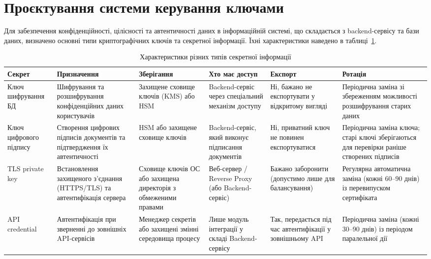 \section{Проєктування системи керування ключами}

Для забезпечення конфіденційності, цілісності та автентичності даних в інформаційній системі, що складається
з backend-сервісу та бази даних, визначено основні типи криптографічних ключів та секретної інформації. Їхні
характеристики наведено в таблиці~\ref{tab:secret_types}.

\begin{table}[H]
\centering
\footnotesize
\renewcommand{\arraystretch}{1.4}
\setlength{\tabcolsep}{4pt}
\begin{tabular}{|>{\raggedright\arraybackslash}p{2.0cm}|>{\raggedright\arraybackslash}p{2.8cm}|>{\raggedright\arraybackslash}p{2.7cm}|>{\raggedright\arraybackslash}p{2.6cm}|>{\raggedright\arraybackslash}p{2.4cm}|>{\raggedright\arraybackslash}p{2.8cm}|}
\hline
\textbf{Секрет} & \textbf{Призначення} & \textbf{Зберігання} & \textbf{Хто має доступ} & \textbf{Експорт} & \textbf{Ротація} \\
\hline
Ключ шифрування БД & Шифрування та розшифрування конфіденційних даних користувачів & Захищене сховище ключів (KMS) або HSM & Backend-сервіс через спеціальний механізм доступу & Ні, бажано не експортувати у відкритому вигляді & Періодична заміна зі збереженням можливості розшифрування старих даних \\
\hline
Ключ цифрового підпису & Створення цифрових підписів документів та підтвердження їх автентичності & HSM або захищене сховище ключів & Backend-сервіс, який виконує підписання документів & Ні, приватний ключ не повинен експортуватися & Періодична заміна ключа; старі ключі зберігаються для перевірки раніше створених підписів \\
\hline
TLS private key & Встановлення захищеного з'єднання (HTTPS/TLS) та автентифікація сервера & Сховище ключів ОС або захищена директорія з обмеженими правами & Веб-сервер / Reverse Proxy (або Backend-сервіс) & Бажано заборонити (допустимо лише для балансування) & Регулярна автоматична заміна (кожні 60--90 днів) із перевипуском сертифіката \\
\hline
API credential & Автентифікація при зверненні до зовнішніх API-сервісів & Менеджер секретів або захищені змінні середовища процесу & Лише модуль інтеграції у складі Backend-сервісу & Так, передається під час автентифікації у зовнішньому API & Періодична заміна (кожні 30--90 днів) із періодом паралельної дії \\
\hline
\end{tabular}
\caption{Характеристики різних типів секретної інформації}
\label{tab:secret_types}
\end{table}

